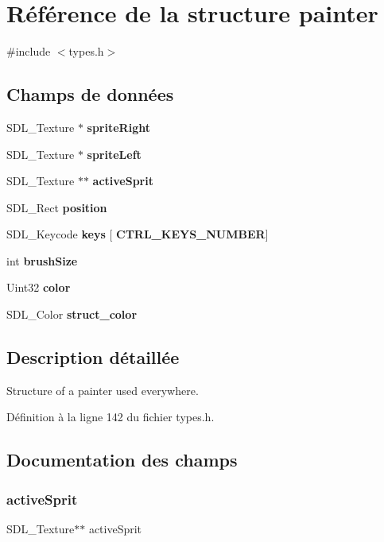 \section{Référence de la structure painter}
\label{structpainter}


{\ttfamily \#include $<$types.\+h$>$}

\subsection*{Champs de données}
\begin{DoxyCompactItemize}
\item 
S\+D\+L\+\_\+\+Texture $\ast$ \textbf{ sprite\+Right}
\item 
S\+D\+L\+\_\+\+Texture $\ast$ \textbf{ sprite\+Left}
\item 
S\+D\+L\+\_\+\+Texture $\ast$$\ast$ \textbf{ active\+Sprit}
\item 
S\+D\+L\+\_\+\+Rect \textbf{ position}
\item 
S\+D\+L\+\_\+\+Keycode \textbf{ keys} [\textbf{ C\+T\+R\+L\+\_\+\+K\+E\+Y\+S\+\_\+\+N\+U\+M\+B\+ER}]
\item 
int \textbf{ brush\+Size}
\item 
Uint32 \textbf{ color}
\item 
S\+D\+L\+\_\+\+Color \textbf{ struct\+\_\+color}
\end{DoxyCompactItemize}


\subsection{Description détaillée}
Structure of a painter used everywhere. 

Définition à la ligne 142 du fichier types.\+h.



\subsection{Documentation des champs}
\mbox{\label{structpainter_a386313f47e956f1544cb6bcd2416836c}} 
\subsubsection{active\+Sprit}
{\footnotesize\ttfamily S\+D\+L\+\_\+\+Texture$\ast$$\ast$ active\+Sprit}


